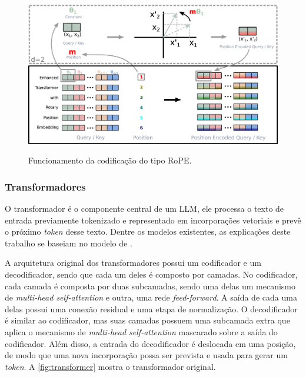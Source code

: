 \begin{figure}[ht]
    \centering
    \caption{\small Funcionamento da codificação do tipo \ac{RoPE}.}
    \includegraphics[width=0.8\columnwidth,keepaspectratio]{images/rotary_positional_embeddings.jpg}
    \label{fig:rotary_positional_embeddings}
\end{figure}

\subsubsection{Transformadores} \label{sec:transformers}

O transformador é o componente central de um \ac{LLM}, ele processa o texto de entrada previamente tokenizado e
representado em incorporações vetoriais e prevê o próximo \textit{token} desse texto. Dentre os modelos existentes, as
explicações deste trabalho se baseiam no modelo de \textcite{transformer}.

A arquitetura original dos transformadores possui um codificador e um decodificador, sendo que cada um deles é composto
por camadas. No codificador, cada camada é composta por duas subcamadas, sendo uma delas um mecanismo de
\textit{multi-head self-attention} e outra, uma rede \textit{feed-forward}. A saída de cada uma delas possui uma
conexão residual e uma etapa de normalização. O decodificador é similar ao codificador, mas suas camadas possuem uma
subcamada extra que aplica o mecanismo de \textit{multi-head self-attention} mascarado sobre a saída do codificador.
Além disso, a entrada do decodificador é deslocada em uma posição, de modo que uma nova incorporação possa ser prevista
e usada para gerar um \textit{token}. A \autoref{fig:transformer} mostra o transformador original.

